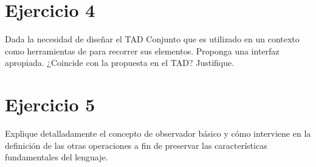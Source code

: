 \documentclass[10pt,a4paper]{article}
\begin{document}
\section{Ejercicio 4}

Dada la necesidad de diseñar el TAD Conjunto que es utilizado en un contexto como herramientas de para recorrer sus elementos. Proponga una interfaz apropiada. ¿Coincide con la propuesta en el TAD? Justifique.
\newpage

\section{Ejercicio 5}

Explique detalladamente el concepto de observador básico y cómo interviene en la definición de las otras operaciones a fin de preservar las características fundamentales del lenguaje.
\newline
\newline
\end{document}

